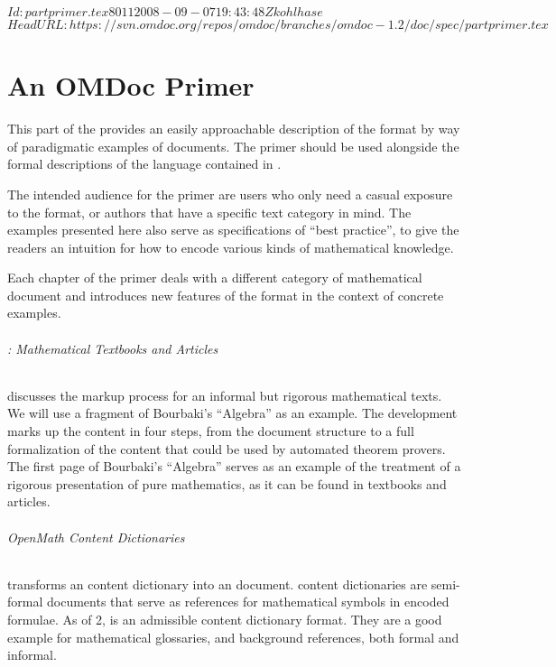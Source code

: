 \svnInfo $Id: partprimer.tex 8011 2008-09-07 19:43:48Z kohlhase $
\svnKeyword $HeadURL: https://svn.omdoc.org/repos/omdoc/branches/omdoc-1.2/doc/spec/partprimer.tex $

\part{An OMDoc Primer}\label{part:primer}
This part of the {\report} provides an easily approachable description of the {\omdoc}
format by way of paradigmatic examples of {\omdoc} documents.  The primer should be used
alongside the formal descriptions of the language contained in
{}.

The intended audience for the primer are users who only need a casual exposure to the
format, or authors that have a specific text category in mind.  The examples presented
here also serve as specifications of ``best practice'', to give the readers an intuition
for how to encode various kinds of mathematical knowledge.

Each chapter of the {\omdoc} primer deals with a different category of mathematical
document and introduces new features of the {\omdoc} format in the context of concrete
examples.

\paragraph{: Mathematical Textbooks and Articles} discusses the markup
process for an informal but rigorous mathematical texts.  We will use a fragment of
Bourbaki's ``Algebra'' as an example.  The development marks up the content in four steps,
from the document structure to a full formalization of the content that could be used by
automated theorem provers.  The first page of Bourbaki's ``Algebra'' serves as an example
of the treatment of a rigorous presentation of pure mathematics, as it can be found in
textbooks and articles.

\paragraph{ OpenMath Content Dictionaries} transforms an {\openmath}
content dictionary into an {\omdoc} document. {\openmath} content dictionaries are
semi-formal documents that serve as references for mathematical symbols in {\openmath}
encoded formulae.  As of {\openmath}2, {\omdoc} is an admissible {\openmath} content
dictionary format. They are a good example for mathematical glossaries, and background
references, both formal and informal.

